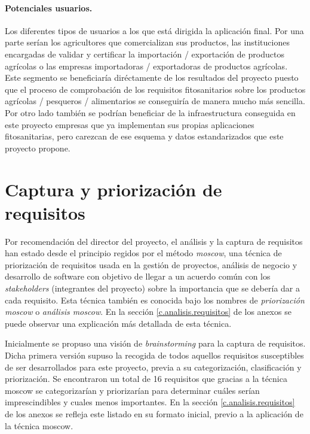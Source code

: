 \paragraph*{Potenciales usuarios.} Los diferentes tipos de usuarios a los que está dirigida la aplicación final. Por una parte serían los  agricultores que comercializan sus productos, las instituciones encargadas de validar y certificar la importación / exportación  de productos agrícolas o las empresas importadoras / exportadoras de productos agrícolas. Este segmento se beneficiaría diréctamente de los resultados del proyecto puesto que el proceso de comprobación de los requisitos fitosanitarios sobre los productos agrícolas / pesqueros / alimentarios se conseguiría de manera mucho más sencilla. Por otro lado también se podrían beneficiar de la infraestructura conseguida en este proyecto empresas que ya implementan sus propias aplicaciones fitosanitarias, pero carezcan de ese esquema y datos estandarizados que este proyecto propone.




\section{Captura y priorización de requisitos} \label{phytoscheme.requisitos}
\par 
Por recomendación del director del proyecto, el análisis y la captura de requisitos han estado desde el principio  regidos por el método \textit{\gls{moscow}}, una técnica de priorización de requisitos usada en la gestión de proyectos, análisis de negocio y desarrollo de software con objetivo de llegar a un acuerdo común con los \textit{stakeholders} (integrantes del proyecto) sobre la importancia que se debería dar a cada requisito. Esta técnica también es conocida bajo los nombres de \textit{priorización \gls{moscow}} o \textit{análisis \gls{moscow}}. En la sección \ref{c.analisis.requisitos} de los anexos se puede observar una explicación más detallada de esta técnica.

\par Inicialmente se propuso una visión de \textit{brainstorming} para la captura de requisitos. Dicha primera versión supuso la recogida de todos aquellos requisitos susceptibles de ser desarrollados para este proyecto, previa a su categorización, clasificación y priorización. Se encontraron un total de 16 requisitos que gracias a la técnica \gls{moscow} se categorizarían y priorizarían para determinar cuáles serían imprescindibles y cuales menos importantes. En la sección \ref{c.analisis.requisitos} de los anexos se refleja este listado en su formato inicial, previo a la aplicación de la técnica \gls{moscow}.



